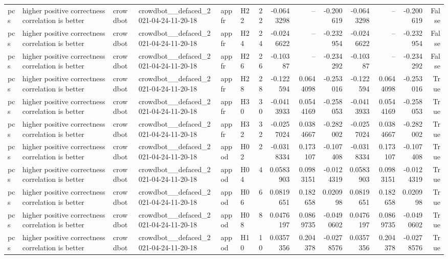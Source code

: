\begin{longtable}{llllllrrrrrrrr}
pcs & higher positive correctness correlation is better & crowdbot & crowdbot\_\_defaced\_2021-04-24-11-20-18 & appfr & H22 & 22 & -0.0643298 & -- & -0.200619 & -0.0643298 & -- & -0.200619 & False \\
pcs & higher positive correctness correlation is better & crowdbot & crowdbot\_\_defaced\_2021-04-24-11-20-18 & appfr & H24 & 24 & -0.0246622 & -- & -0.232954 & -0.0246622 & -- & -0.232954 & False \\
pcs & higher positive correctness correlation is better & crowdbot & crowdbot\_\_defaced\_2021-04-24-11-20-18 & appfr & H26 & 26 & -0.10387 & -- & -0.234292 & -0.10387 & -- & -0.234292 & False \\
pcs & higher positive correctness correlation is better & crowdbot & crowdbot\_\_defaced\_2021-04-24-11-20-18 & appfr & H28 & 28 & -0.122594 & 0.0644098 & -0.253016 & -0.122594 & 0.0644098 & -0.253016 & True \\
pcs & higher positive correctness correlation is better & crowdbot & crowdbot\_\_defaced\_2021-04-24-11-20-18 & appfr & H30 & 30 & -0.0413933 & 0.0544169 & -0.258053 & -0.0413933 & 0.0544169 & -0.258053 & True \\
pcs & higher positive correctness correlation is better & crowdbot & crowdbot\_\_defaced\_2021-04-24-11-20-18 & appfr & H32 & 32 & -0.0257024 & 0.0384667 & -0.282002 & -0.0257024 & 0.0384667 & -0.282002 & True \\
pcs & higher positive correctness correlation is better & crowdbot & crowdbot\_\_defaced\_2021-04-24-11-20-18 & appod & H02 & 2 & -0.0318334 & 0.173107 & -0.107408 & -0.0318334 & 0.173107 & -0.107408 & True \\
pcs & higher positive correctness correlation is better & crowdbot & crowdbot\_\_defaced\_2021-04-24-11-20-18 & appod & H04 & 4 & 0.0583903 & 0.0983151 & -0.0124319 & 0.0583903 & 0.0983151 & -0.0124319 & True \\
pcs & higher positive correctness correlation is better & crowdbot & crowdbot\_\_defaced\_2021-04-24-11-20-18 & appod & H06 & 6 & 0.0819651 & 0.182658 & 0.020998 & 0.0819651 & 0.182658 & 0.020998 & True \\
pcs & higher positive correctness correlation is better & crowdbot & crowdbot\_\_defaced\_2021-04-24-11-20-18 & appod & H08 & 8 & 0.0476197 & 0.0869735 & -0.0490602 & 0.0476197 & 0.0869735 & -0.0490602 & True \\
pcs & higher positive correctness correlation is better & crowdbot & crowdbot\_\_defaced\_2021-04-24-11-20-18 & appod & H10 & 10 & 0.0357356 & 0.204378 & -0.0278576 & 0.0357356 & 0.204378 & -0.0278576 & True \\

\end{longtable}

